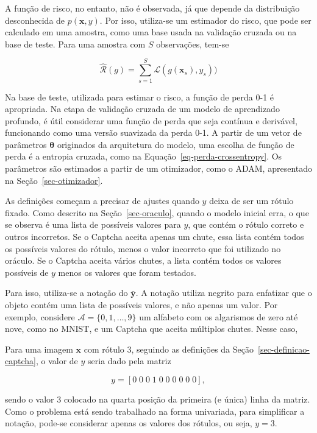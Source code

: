 \documentclass[12pt,twoside,brazilian]{book}
\begin{document}
A função de risco, no entanto, não é observada, já que depende da
distribuição desconhecida de \(p(\mathbf x,y)\). Por isso, utiliza-se um
estimador do risco, que pode ser calculado em uma amostra, como uma base
usada na validação cruzada ou na base de teste. Para uma amostra com
\(S\) observações, tem-se

\[
\hat{\mathcal R}(g) = \sum_{s=1}^S \mathcal L(g(\mathbf x_s),y_s))
\]

Na base de teste, utilizada para estimar o risco, a função de perda 0-1
é apropriada. Na etapa de validação cruzada de um modelo de aprendizado
profundo, é útil considerar uma função de perda que seja contínua e
derivável, funcionando como uma versão suavizada da perda 0-1. A partir
de um vetor de parâmetros \(\boldsymbol \theta\) originados da
arquitetura do modelo, uma escolha de função de perda é a entropia
cruzada, como na Equação~\ref{eq-perda-crossentropy}. Os parâmetros são
estimados a partir de um otimizador, como o ADAM, apresentado na
Seção~\ref{sec-otimizador}.

As definições começam a precisar de ajustes quando \(y\) deixa de ser um
rótulo fixado. Como descrito na Seção~\ref{sec-oraculo}, quando o modelo
inicial erra, o que se observa é uma lista de possíveis valores para
\(y\), que contém o rótulo correto e outros incorretos. Se o Captcha
aceita apenas um chute, essa lista contém todos os possíveis valores do
rótulo, menos o valor incorreto que foi utilizado no oráculo. Se o
Captcha aceita vários chutes, a lista contém todos os valores possíveis
de \(y\) menos os valores que foram testados.

Para isso, utiliza-se a notação do \(\bar {\mathbf y}\). A notação
utiliza negrito para enfatizar que o objeto contém uma lista de
possíveis valores, e não apenas um valor. Por exemplo, considere
\(\mathcal A = \{0,1,\dots,9\}\) um alfabeto com os algarismos de zero
até nove, como no MNIST, e um Captcha que aceita múltiplos chutes. Nesse
caso,

Para uma imagem \(\mathbf x\) com rótulo \(3\), seguindo as definições
da Seção~\ref{sec-definicao-captcha}, o valor de \(y\) seria dado pela
matriz

\[
y = [0\;0\;0\;1\;0\;0\;0\;0\;0\;0],
\]

sendo o valor \(3\) colocado na quarta posição da primeira (e única)
linha da matriz. Como o problema está sendo trabalhado na forma
univariada, para simplificar a notação, pode-se considerar apenas os
valores dos rótulos, ou seja, \(y=3\).
\end{document}

